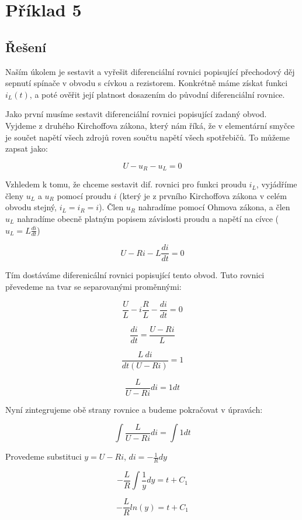 \section{Příklad 5}

\subsection{Řešení}

Naším úkolem je sestavit a vyřešit diferenciální rovnici popisující přechodový děj sepnutí spínače v 
obvodu s cívkou a rezistorem. Konkrétně máme získat funkci $i_L(t)$, a poté ověřit její platnost dosazením do původní diferenciální rovnice.

\par

Jako první musíme sestavit diferenciální rovnici popisující zadaný obvod. Vyjdeme z druhého Kirchoffova zákona, který nám říká, že v elementární smyčce je součet napětí všech zdrojů roven součtu napětí všech spotřebičů. To můžeme zapsat jako:

$$ U - u_R - u_L = 0$$

Vzhledem k tomu, že chceme sestavit dif. rovnici pro funkci proudu $i_L$, vyjádříme členy $u_L$ a $u_R$ pomocí proudu $i$ (který je z prvního Kirchoffova zákona v celém obvodu stejný, $i_L = i_R = i$). Člen $u_R$ nahradíme pomocí Ohmova zákona, a člen $u_L$ nahradíme obecně platným popisem závislosti proudu a napětí na cívce ($u_L = L\frac{di}{dt}$)

$$ U - Ri - L\frac{di}{dt} = 0 $$

Tím dostáváme diferenicální rovnici popisující tento obvod. Tuto rovnici převedeme na tvar se separovanými proměnnými:

$$ \frac{U}{L} - i\frac{R}{L} - \frac{di}{dt} = 0 $$

$$ \frac{di}{dt} = \frac{U - Ri}{L} $$

$$ \frac{L\:di}{dt(U - Ri)} = 1 $$

$$ \frac{L}{U - Ri} di = 1 dt $$

Nyní zintegrujeme obě strany rovnice a budeme pokračovat v úpravách:

$$ \int \frac{L}{U - Ri} di = \int 1 dt $$

Provedeme substituci $y = U - Ri$, $di = -\frac{1}{R} dy$

$$ -\frac{L}{R} \int \frac{1}{y} dy = t + C_1 $$

$$ -\frac{L}{R} ln(y) = t + C_1 $$

